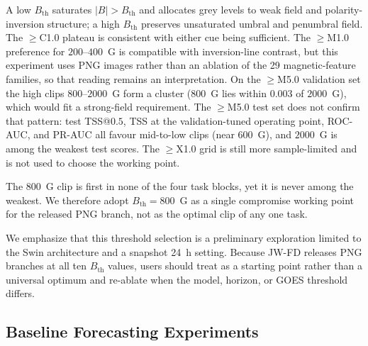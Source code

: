 \documentclass[universe,article,submit,moreauthors]{Definitions/mdpi}
\newif\ifrevision
\newcommand{\add}[1]{\ifrevision\textcolor{blue}{#1}\else#1\fi}
\newcommand{\del}[1]{\ifrevision\textcolor{red}{\sout{#1}}\else\fi}
\newcommand{\chg}[2]{\del{#1}\add{#2}}
\begin{document}
\add{A low $B_{\mathrm{th}}$ saturates $|B|>B_{\mathrm{th}}$ and allocates grey levels to weak field and polarity-inversion structure; a high $B_{\mathrm{th}}$ preserves unsaturated umbral and penumbral field. The $\geq$C1.0 plateau is consistent with either cue being sufficient. The $\geq$M1.0 preference for $200$--$400$~G is compatible with inversion-line contrast, but this experiment uses PNG images rather than an ablation of the 29 magnetic-feature families, so that reading remains an interpretation. On the $\geq$M5.0 validation set the high clips $800$--$2000$~G form a cluster ($800$~G lies within $0.003$ of $2000$~G), which would fit a strong-field requirement. The $\geq$M5.0 test set does not confirm that pattern: test TSS@$0.5$, TSS at the validation-tuned operating point, ROC-AUC, and PR-AUC all favour mid-to-low clips (near $600$~G), and $2000$~G is among the weakest test scores. The $\geq$X1.0 grid is still more sample-limited and is not used to choose the working point.}

\add{The $800$~G clip is first in none of the four task blocks, yet it is never among the weakest. We therefore adopt $B_{\mathrm{th}}=800$~G as a single compromise working point for the released PNG branch, not as the optimal clip of any one task.}

We emphasize that this threshold selection is a preliminary exploration limited to the Swin architecture and a snapshot 24~h setting. Because JW-FD releases PNG branches at all ten $B_{\mathrm{th}}$ values, users should treat \chg{1000~G}{the $800$~G compromise} as a starting point rather than a universal optimum and re-ablate when the model, horizon, or GOES threshold differs. \del{That first ablation also omitted 1200, 1400, 1600, and 1800~G. After the 19-AR rebalance, both this ten-threshold grid and the four-model 24~h baselines need to be retrained on the released assignment: four isolated-X regions that were in the seed-62 training set now sit in the test set, so the present checkpoints cannot be scored on the released split.}

\subsection{Baseline Forecasting Experiments}
\label{sec:baseline}
\end{document}
